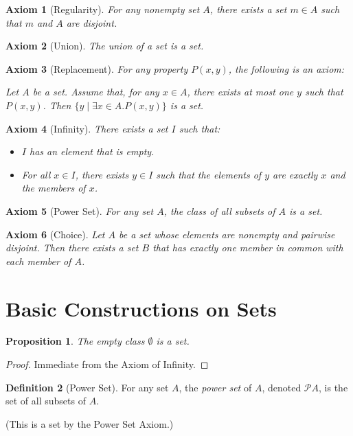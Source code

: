 \documentclass{book}
\let\qed\relax
\newtheorem{ax}{Axiom}
\newtheorem{prop}{Proposition}[chapter]
\theoremstyle{definition}
\newtheorem{df}[prop]{Definition}
\begin{document}
\begin{ax}[Regularity]
    For any nonempty set $A$, there exists a set $m \in A$ such that $m$ and $A$ are disjoint.
\end{ax}

\begin{ax}[Union]
    The union of a set is a set.
\end{ax}

\begin{ax}[Replacement]
    For any property $P(x,y)$, the following is an axiom:

    Let $A$ be a set. Assume that, for any $x \in A$, there exists at most one $y$ such that $P(x,y)$. Then $\{ y \mid \exists x \in A. P(x,y) \}$ is a set.
\end{ax}

\begin{ax}[Infinity]
    There exists a set $I$ such that:
    \begin{itemize}
        \item $I$ has an element that is empty.
        \item For all $x \in I$, there exists $y \in I$ such that the elements of $y$ are exactly $x$ and the members of $x$.
    \end{itemize}
\end{ax}

\begin{ax}[Power Set]
    For any set $A$, the class of all subsets of $A$ is a set.
\end{ax}

\begin{ax}[Choice]
    Let $A$ be a set whose elements are nonempty and pairwise disjoint. Then there exists a set $B$ that has exactly one member in common with each member of $A$.
\end{ax}

\section{Basic Constructions on Sets}

\begin{prop}
    The empty class $\emptyset$ is a set.
\end{prop}

\begin{proof}
    Immediate from the Axiom of Infinity. \qed
\end{proof}

\begin{df}[Power Set]
    For any set $A$, the \emph{power set} of $A$, denoted $\mathcal{P} A$, is the set of all subsets of $A$.

    (This is a set by the Power Set Axiom.)
\end{df}
\end{document}
